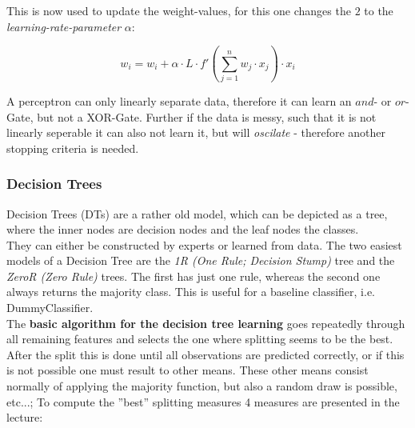 \documentclass[12pt,a4paper]{article}
\begin{document}
\noindent This is now used to update the weight-values, for this one changes the \(2\) to the \textit{learning-rate-parameter} \(\alpha\):

\[w_i = w_i + \alpha \cdot L \cdot f'(\sum_{j = 1}^n w_j \cdot x_j) \cdot x_i\]

\noindent A perceptron can only linearly separate data, therefore it can learn an \(and\)- or \(or\)-Gate, but not a XOR-Gate. Further if the data is messy, such that it is not linearly seperable it can also not learn it, but will \textit{oscilate} - therefore another stopping criteria is needed.

\subsubsection{Decision Trees}
\label{subsubsection:dt}


\noindent Decision Trees (DTs) are a rather old model, which can be depicted as a tree, where the inner nodes are decision nodes and the leaf nodes the classes.\\
They can either be constructed by experts or learned from data. The two easiest models of a Decision Tree are the \textit{1R (One Rule; Decision Stump)} tree and the \textit{ZeroR (Zero Rule)} trees. The first has just one rule, whereas the second one always returns the majority class. This is useful for a baseline classifier, i.e. DummyClassifier.\\
The \textbf{basic algorithm for the decision tree learning} goes repeatedly through all remaining features and selects the one where splitting seems to be the best. After the split this is done until all observations are predicted correctly, or if this is not possible one must result to other means. These other means consist normally of applying the majority function, but also a random draw is possible, etc...; To compute the ''best'' splitting measures 4 measures are presented in the lecture:
\end{document}
